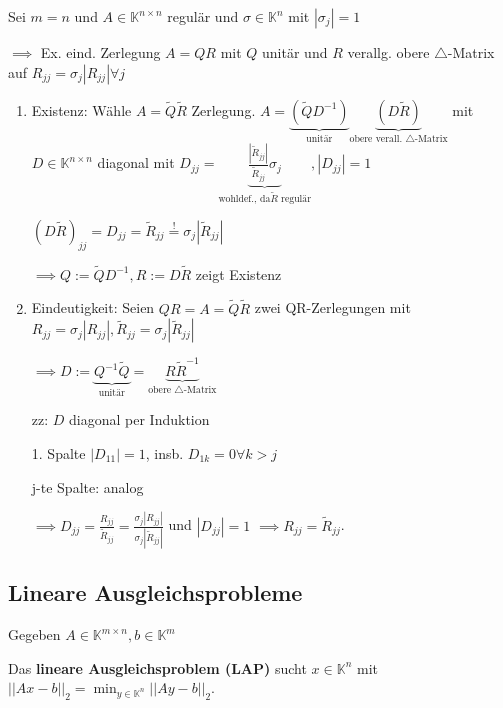 \begin{theorem}
	Sei $m=n$ und $A \in \mathbb{K}^{n\times n}$ regulär und $\sigma \in \mathbb{K}^n$ mit $|\sigma_j|=1$
	
	$\implies$ Ex. eind. Zerlegung $A=QR$ mit $Q$ unitär und $R$ verallg. obere $\triangle$-Matrix auf $R_{jj} = \sigma_j |R_{jj}| \forall j$
\end{theorem}

\begin{theorem}
	\begin{enumerate}
		\item Existenz: Wähle $A = \tilde{Q} \tilde{R}$ Zerlegung. $A = \underbrace{(\tilde{Q}D^{-1})}_{\text{unitär}}\underbrace{(D\tilde{R})}_{\text{obere verall. }\triangle\text{-Matrix}}$ mit $D \in \mathbb{K}^{n\times n}$ diagonal mit $D_{jj} = \underbrace{\frac{|\tilde{R}_{jj}|}{\tilde{R}_{jj}}\sigma_j}_{\text{wohldef., da} \tilde{R} \text{ regulär}}, |D_{jj}| = 1$
		
		$(D\tilde{R})_{jj} = D_{jj} = \tilde{R}_{jj} \overset{!}{=} \sigma_j |\tilde{R}_{jj}|$
		
		$\implies Q:= \tilde{Q}D^{-1}, R := D\tilde{R}$ zeigt Existenz
		
		\item Eindeutigkeit: Seien $QR=A=\tilde{Q}\tilde{R}$ zwei QR-Zerlegungen mit $R_{jj} = \sigma_j |R_{jj}|, \tilde{R}_{jj} = \sigma_j |\tilde{R}_{jj}|$
		
		$\implies D := \underbrace{Q^{-1}\tilde{Q}}_{\text{unitär}} = \underbrace{R\tilde{R}^{-1}}_{\text{obere }\triangle\text{-Matrix}}$
		
		zz: $D$ diagonal per Induktion
		
		1. Spalte $|D_{11}| = 1$, insb. $D_{1k} = 0 \forall k > j$
		
		j-te Spalte: analog
		
		$\implies D_{jj} = \frac{R_{jj}}{\tilde{R}_{jj}} = \frac{\sigma_j |R_{jj}|}{\sigma_j |\tilde{R}_{jj}|}$ und $|D_{jj}| = 1$ $\implies R_{jj} = \tilde{R}_{jj}$.
	\end{enumerate}
\end{theorem}

\subsection{Lineare Ausgleichsprobleme}

Gegeben $A \in \mathbb{K}^{m\times n}, b \in \mathbb{K}^m$

Das \textbf{lineare Ausgleichsproblem (LAP)} sucht $x \in \mathbb{K}^n$ mit $||Ax-b||_2 = \min_{y \in \mathbb{K}^n} ||Ay-b||_2$.


